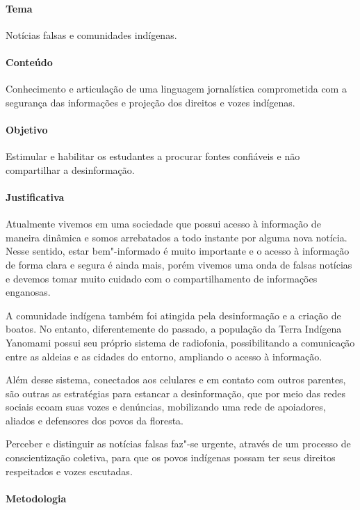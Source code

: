 \documentclass[12pt]{extarticle}
\begin{document}
\paragraph{Tema} Notícias falsas e comunidades indígenas.

\paragraph{Conteúdo} Conhecimento e articulação de uma linguagem jornalística
comprometida com a segurança das informações e projeção dos direitos e vozes
indígenas. 

\paragraph{Objetivo} Estimular e habilitar os estudantes a procurar fontes
confiáveis e não compartilhar a desinformação.

\paragraph{Justificativa} Atualmente vivemos em uma sociedade que possui acesso 
à informação de maneira dinâmica e somos arrebatados a todo instante por alguma 
nova notícia. Nesse sentido, estar bem"-informado é muito importante e o acesso à
informação de forma clara e segura é ainda mais, porém vivemos uma onda de falsas 
notícias e devemos tomar muito cuidado com o compartilhamento de informações enganosas.

A comunidade indígena também foi atingida pela desinformação e a criação de boatos.
No entanto, diferentemente do passado, a população da Terra Indígena Yanomami possui seu
próprio sistema de radiofonia, possibilitando a comunicação entre as aldeias e as cidades 
do entorno, ampliando o acesso à informação.

Além desse sistema, conectados aos celulares e em contato com outros parentes, são outras as
estratégias para estancar a desinformação, que por meio das redes sociais ecoam suas vozes e 
denúncias, mobilizando uma rede de apoiadores, aliados e defensores dos povos da floresta. 

Perceber e distinguir as notícias falsas faz"-se urgente, através de um processo de conscientização
coletiva, para que os povos indígenas possam ter seus direitos respeitados e vozes escutadas. 

\paragraph{Metodologia} 
\end{document}
